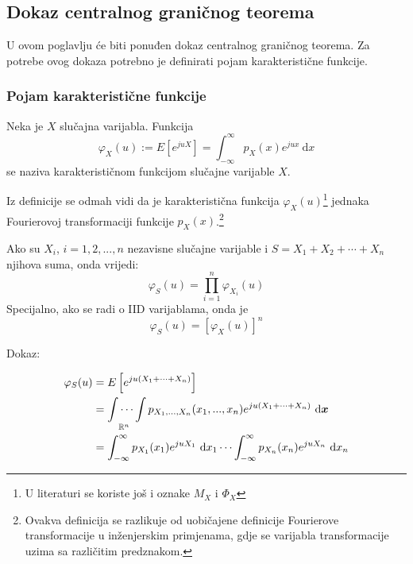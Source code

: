 \subsection{Dokaz centralnog graničnog teorema} \label{sec:dokaz-clt}

U ovom poglavlju će biti ponuđen dokaz centralnog graničnog teorema. Za potrebe
ovog dokaza potrebno je definirati pojam karakteristične funkcije.

\subsubsection{Pojam karakteristične funkcije}

\begin{definition}
  Neka je $X$ slučajna varijabla. Funkcija 
  \begin{equation}
    \varphi_X(u) := E\left[e^{juX}\right]
    = \int_{-\infty}^{\infty} p_X(x) e^{jux} \ \mathrm dx
  \end{equation}
  se naziva karakterističnom funkcijom slučajne varijable $X$.
\end{definition}

Iz definicije se odmah vidi da je karakteristična funkcija
$\varphi_X(u)$\footnote{U literaturi se koriste još i oznake $M_X$ i $\Phi_X$}
jednaka Fourierovoj transformaciji funkcije $p_X(x)$.\footnote{ Ovakva
  definicija se razlikuje od uobičajene definicije Fourierove transformacije u
inženjerskim primjenama, gdje se varijabla transformacije uzima sa različitim
predznakom.}

\begin{property}
  Ako su $X_i$, $i=1,2,...,n$ nezavisne slučajne varijable i
  $S=X_1+X_2+\cdots+X_n$ njihova suma, onda vrijedi:
  \begin{equation}
    \varphi_S(u) = \prod_{i=1}^{n} \varphi_{X_i}(u)
  \end{equation}
  Specijalno, ako se radi o IID varijablama, onda je
  \begin{equation} \label{eq:char-power}
    \varphi_S(u) = [\varphi_X(u)]^n
  \end{equation}
\end{property}

Dokaz:

\begin{align}
  \varphi_S(u)
  &= E\left[e^{ju(X_1+\cdots+X_n)}\right] \\
  &= \idotsint\limits_{\mathbb{R}^n}
    p_{X_1,...,X_n}(x_1,...,x_n) e^{ju(X_1+\cdots+X_n)} \ \text d\bm x \nonumber \\
  &= \int_{-\infty}^{\infty} p_{X_1}(x_1)e^{juX_1}\ \mathrm dx_1 \cdots
    \int_{-\infty}^{\infty} p_{X_n}(x_n)e^{juX_n}\ \mathrm dx_n
\end{align}

